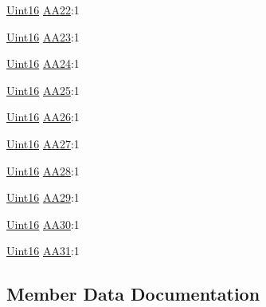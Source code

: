 \begin{DoxyCompactItemize}
\item 
\hyperlink{_d_s_p2833x___device_8h_a59a9f6be4562c327cbfb4f7e8e18f08b}{Uint16} \hyperlink{struct_c_a_n_a_a___b_i_t_s_ab6be20c942f45ac4874c01c40fc6be27}{A\+A22}\+:1
\item 
\hyperlink{_d_s_p2833x___device_8h_a59a9f6be4562c327cbfb4f7e8e18f08b}{Uint16} \hyperlink{struct_c_a_n_a_a___b_i_t_s_a8b1329e3d3cc9085384932d47ecfd682}{A\+A23}\+:1
\item 
\hyperlink{_d_s_p2833x___device_8h_a59a9f6be4562c327cbfb4f7e8e18f08b}{Uint16} \hyperlink{struct_c_a_n_a_a___b_i_t_s_adefea083e8115c42bb3422d9ff369862}{A\+A24}\+:1
\item 
\hyperlink{_d_s_p2833x___device_8h_a59a9f6be4562c327cbfb4f7e8e18f08b}{Uint16} \hyperlink{struct_c_a_n_a_a___b_i_t_s_a9b12f95cd5bc5e14f2dd20c755d1274f}{A\+A25}\+:1
\item 
\hyperlink{_d_s_p2833x___device_8h_a59a9f6be4562c327cbfb4f7e8e18f08b}{Uint16} \hyperlink{struct_c_a_n_a_a___b_i_t_s_a5b62bbd7d39748b14fd2b88897be53b3}{A\+A26}\+:1
\item 
\hyperlink{_d_s_p2833x___device_8h_a59a9f6be4562c327cbfb4f7e8e18f08b}{Uint16} \hyperlink{struct_c_a_n_a_a___b_i_t_s_a663d1845b01499307fedf080ca3892c8}{A\+A27}\+:1
\item 
\hyperlink{_d_s_p2833x___device_8h_a59a9f6be4562c327cbfb4f7e8e18f08b}{Uint16} \hyperlink{struct_c_a_n_a_a___b_i_t_s_a1e4e2d73b1ec1494fc4f10c874044f2a}{A\+A28}\+:1
\item 
\hyperlink{_d_s_p2833x___device_8h_a59a9f6be4562c327cbfb4f7e8e18f08b}{Uint16} \hyperlink{struct_c_a_n_a_a___b_i_t_s_a8119f14cbea2bb6538ea933000ee4bf8}{A\+A29}\+:1
\item 
\hyperlink{_d_s_p2833x___device_8h_a59a9f6be4562c327cbfb4f7e8e18f08b}{Uint16} \hyperlink{struct_c_a_n_a_a___b_i_t_s_afc7babd954f86dedfcdc7516d72541e2}{A\+A30}\+:1
\item 
\hyperlink{_d_s_p2833x___device_8h_a59a9f6be4562c327cbfb4f7e8e18f08b}{Uint16} \hyperlink{struct_c_a_n_a_a___b_i_t_s_a77d6e2ff6572c29ba25bea8630b3373a}{A\+A31}\+:1
\end{DoxyCompactItemize}


\subsection{Member Data Documentation}
\hypertarget{struct_c_a_n_a_a___b_i_t_s_a1f67dad2c9799632fb593404cf3851ec}{}
